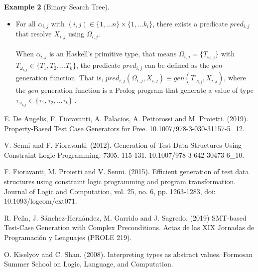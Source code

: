 \documentclass{report}
\theoremstyle{definition}
\newtheorem{example}{Example}[section]
\theoremstyle{definition}
\newcommand{\ttt}[1]{\texttt{#1}}
\begin{document}
\begin{example}[Binary Search Tree]
\begin{itemize}
\begin{example}
\begin{itemize}
			\item As $\; \ttt{Weird} \;$ constructor requires both types \ttt{SomethingWeird Int String Bool} and  \ttt{String}, that is, $a_{3,1} = \ttt{SomethingWeird Int String Bool}$ and $a_{3,2} = \ttt{String}$, therefore $\Omega_{3,1} = \{\ttt{int}, \ttt{string}, \ttt{bool}\} \subseteq \{\ttt{int}, \ttt{string}, \ttt{bool}\}$ and $\Omega_{3,2} = \{\ttt{string}\} \subset \{\ttt{int}, \ttt{string}, \ttt{bool}\}$.
		\end{itemize}
	\end{example}
	\item For all $\alpha_{i,j}$ with $(i,j) \in \{1, \ldots n \} \times \{1, \ldots k_i \}$, there exists a predicate $pred_{i,j}$ that resolve $X_{i,j}$ using $\Omega_{i,j}$.\\\\
	When $\alpha_{i,j}$ is an Haskell's primitive type, that means $\Omega_{i,j} = \{T_{\omega_{i,j}}\}$ with $T_{\omega_{i,j}} \in \{ T_1 , T_2, \ldots T_k \}$, the predicate $pred_{i,j}$ can be defined as the $gen$ generation function. That is, $pred_{i,j}(\Omega_{i,j}, X_{i,j}) \equiv gen(T_{\omega_{i,j}}, X_{i,j})$, where the $gen$ generation function is a Prolog program that generate a value of type $\tau_{\omega_{i,j}} \in \{ \tau_1 , \tau_2, \ldots \tau_k \}$ .

\end{itemize}


\begin{thebibliography}{9}
	E. De Angelis, F. Fioravanti, A. Palacios, A. Pettorossi and M. Proietti. (2019). Property-Based Test Case Generators for Free. 10.1007/978-3-030-31157-5\_12. 
						
	V. Senni and F. Fioravanti. (2012). Generation of Test Data Structures Using Constraint Logic Programming. 7305. 115-131. 10.1007/978-3-642-30473-6\_10.
						
	F. Fioravanti, M. Proietti and V. Senni. (2015). Efficient generation of test data structures using constraint logic programming and program transformation. Journal of Logic and Computation, vol. 25, no. 6, pp. 1263-1283, doi: 10.1093/logcom/ext071.
						
	R. Peña, J. Sánchez-Hernández, M. Garrido and J. Sagredo. (2019) SMT-based Test-Case Generation with Complex Preconditions. Actas de las XIX Jornadas de Programación y Lenguajes (PROLE 219).
						
	O. Kiselyov and C. Shan. (2008). Interpreting types as abstract values. Formosan Summer School on Logic, Language, and Computation.
						

\end{thebibliography}
\end{example}
\end{document}
